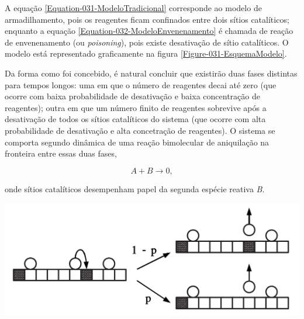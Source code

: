A equação \ref{Equation-031-ModeloTradicional} corresponde ao modelo de armadilhamento, pois
os reagentes ficam confinados entre dois sítios catalíticos; enquanto a equação
\ref{Equation-032-ModeloEnvenenamento} é chamada de reação de envenenamento (ou
\textit{poisoning}), pois existe desativação de sítio catalíticos. O modelo está
representado graficamente na figura \ref{Figure-031-EsquemaModelo}.

Da forma como foi concebido, é natural concluir que existirão duas fases
distintas para tempos longos: uma em que o número de reagentes decai até zero
(que ocorre com baixa probabilidade de desativação e baixa concentração de
reagentes); outra em que um número finito de reagentes sobrevive após a
desativação de todos os sítios catalíticos do sistema (que ocorre com alta
probabilidade de desativação e alta concetração de reagentes). O sistema se
comporta segundo dinâmica de uma reação bimolecular de aniquilação na fronteira
entre essas duas fases,

{
\setlength{\belowdisplayskip}{0pt} \setlength{\belowdisplayshortskip}{0pt}
\setlength{\abovedisplayskip}{0pt} \setlength{\abovedisplayshortskip}{0pt}

\begin{equation}
  A + B \longrightarrow 0,
  \label{Equation-032-ModeloBimolecular}
\end{equation}
}

\noindent onde sítios catalíticos desempenham papel da segunda espécie reativa
\textit{B}.

{
  \centering
  \captionsetup{type=figure}
	\includegraphics[width=\columnwidth]{./figures/031-EsquemaModelo.png}
	\label{Figure-031-EsquemaModelo}
}
